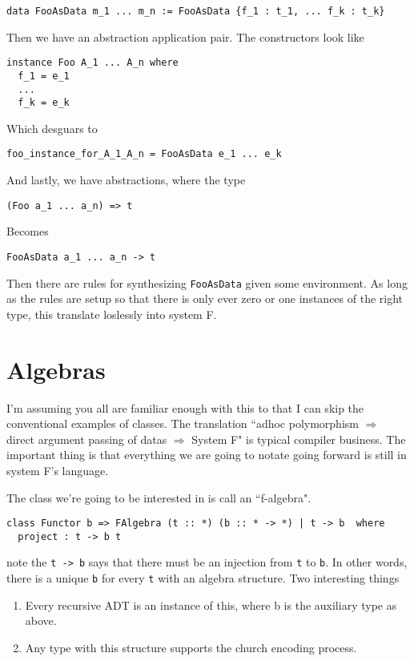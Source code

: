 \documentclass[12pt]{article}
\newcommand{\hask}{\texttt}
\begin{document}
\begin{verbatim}
data FooAsData m_1 ... m_n := FooAsData {f_1 : t_1, ... f_k : t_k}
\end{verbatim}
Then we have an abstraction application pair.
The constructors look like
\begin{verbatim}
instance Foo A_1 ... A_n where
  f_1 = e_1
  ...
  f_k = e_k
\end{verbatim}
Which desguars to
\begin{verbatim}
foo_instance_for_A_1_A_n = FooAsData e_1 ... e_k
\end{verbatim}

And lastly, we have abstractions, where the type

\begin{verbatim}
(Foo a_1 ... a_n) => t
\end{verbatim}
Becomes
\begin{verbatim}
FooAsData a_1 ... a_n -> t
\end{verbatim}
Then there are rules for synthesizing \hask{FooAsData} given some environment.
As long as the rules are setup so that there is only ever zero or one instances of the right type, this translate loslessly into system F.


\section{Algebras}
I'm assuming you all are familiar enough with this to that I can skip the conventional examples of classes.
The translation ``adhoc polymorphism $\Rightarrow$ direct argument passing of datas $\Rightarrow$ System F" is typical compiler business.
The important thing is that everything we are going to notate going forward is still in system F's language.

The class we're going to be interested in is call an ``f-algebra".

\begin{verbatim}
class Functor b => FAlgebra (t :: *) (b :: * -> *) | t -> b  where
  project : t -> b t
\end{verbatim}

note the \hask{t -> b} says that there must be an injection from \hask{t} to \hask{b}.
In other words, there is a unique \hask{b} for every \hask{t} with an algebra structure.
Two interesting things
\begin{enumerate}
    \item Every recursive ADT is an instance of this, where b is the auxiliary type as above.
    \item Any type with this structure supports the church encoding process.
\end{enumerate}
\end{document}
